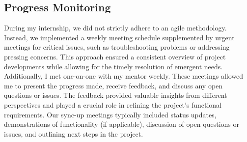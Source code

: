 \subsection{Progress Monitoring}
During my internship, we did not strictly adhere to an agile methodology. Instead, we implemented a weekly meeting schedule supplemented by urgent meetings for critical issues, such as troubleshooting problems or addressing pressing concerns. This approach ensured a consistent overview of project developments while allowing for the timely resolution of emergent needs. Additionally, I met one-on-one with my mentor weekly. These meetings allowed me to present the progress made, receive feedback, and discuss any open questions or issues. The feedback provided valuable insights from different perspectives and played a crucial role in refining the project’s functional requirements. Our sync-up meetings typically included status updates, demonstrations of functionality (if applicable), discussion of open questions or issues, and outlining next steps in the project.


